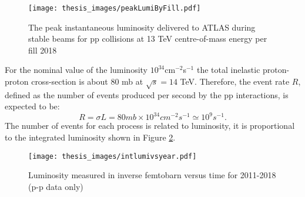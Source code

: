\documentclass[a4paper, oneside, 11pt, openright]{book}
\begin{document}
				\begin{figure}
					\centering
					\texttt{[image: thesis\_images/peakLumiByFill.pdf]}
					\caption{The peak instantaneous luminosity delivered to ATLAS during stable beams for pp collisions at 13 TeV centre-of-mass energy per fill 2018}
					\label{fig:insta lum}
				\end{figure}
				
				For the nominal value of the luminosity $10^{34}$cm$^{-2}$s$^{-1}$ the total inelastic proton-proton cross-section is about 80 mb at $\sqrt{s} = 14$ TeV. Therefore, the event rate $R$, defined as the number of events produced per second by the pp interactions, is expected to be:
				$$
				R = \sigma L = 80 mb\times10^{34}cm^{-2}s^{-1} \simeq 10^{9}s^{-1}.
				$$ 
				The number of events for each process is related to luminosity, it is proportional to the integrated luminosity shown in Figure \ref{fig:Integreted Luminosity}.
				
				\begin{figure}
					\centering
					\texttt{[image: thesis\_images/intlumivsyear.pdf]}
					\caption{Luminosity measured in inverse femtobarn versus time for 2011-2018 (p-p data only)}
					\label{fig:Integreted Luminosity}
				\end{figure}
				
\end{document}
